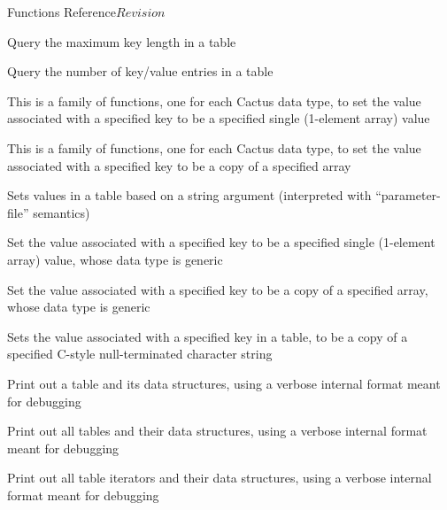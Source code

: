 \begin{cactuspart}{ Functions Reference}{}{$Revision$}
\begin{Lentry}
\item[\code{Util\_TableQueryMaxKeyLength}]
     [\pageref{Util-TableQueryMaxKeyLength}]
Query the maximum key length in a table

\item[\code{Util\_TableQueryNKeys}]
     [\pageref{Util-TableQueryNKeys}]
Query the number of key/value entries in a table

\item[\code{Util\_TableSet*}]
     [\pageref{Util-TableSet*}]
This is a family of functions, one for each Cactus data type,
to set the value associated with a specified key to be a specified
single (1-element array) value

\item[\code{Util\_TableSet*Array}]
     [\pageref{Util-TableSet*Array}]
This is a family of functions, one for each Cactus data type,
to set the value associated with a specified key to be a copy
of a specified array

\item[\code{Util\_TableSetFromString}]
     [\pageref{Util-TableSetFromString}]
Sets values in a table based on a string argument (interpreted with
``parameter-file'' semantics)

\item[\code{Util\_TableSetGeneric}]
     [\pageref{Util-TableSetGeneric}]
Set the value associated with a specified key to be a specified
single (1-element array) value, whose data type is generic

\item[\code{Util\_TableSetGenericArray}]
     [\pageref{Util-TableSetGenericArray}]
Set the value associated with a specified key to be a copy of a
specified array, whose data type is generic

\item[\code{Util\_TableSetString}]
     [\pageref{Util-TableSetString}]
Sets the value associated with a specified key in a table, to be
a copy of a specified C-style null-terminated character string

\item[\code{Util\_TablePrint}]
     [\pageref{Util-TablePrint}]
Print out a table and its data structures, using a verbose internal
format meant for debugging

\item[\code{Util\_TablePrintAll}]
     [\pageref{Util-TablePrintAll}]
Print out all tables and their data structures, using a verbose
internal format meant for debugging

\item[\code{Util\_TablePrintAllIterators}]
     [\pageref{Util-TablePrintAllIterators}]
Print out all table iterators and their data structures, using a
verbose internal format meant for debugging


\end{Lentry}
\end{cactuspart}
